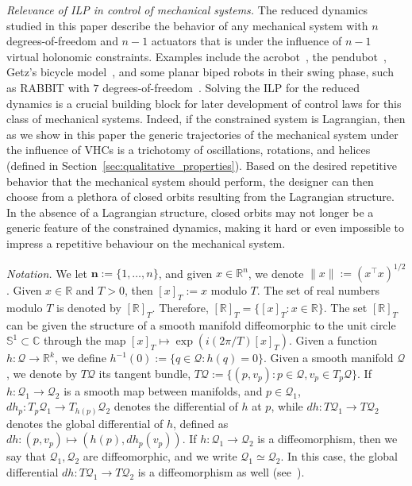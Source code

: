 {\em Relevance of ILP in control of mechanical systems.} The reduced
dynamics studied in this paper describe the behavior of any mechanical
system with $n$ degrees-of-freedom and $n-1$ actuators that is under the
influence of $n-1$ virtual holonomic constraints.  Examples include
the acrobot~\cite{nakanishi-2000}, the
pendubot~\cite{consolini2011swing}, Getz's bicycle
model~\cite{Consolini-2012}, and some planar biped robots in their
swing phase, such as RABBIT with $7$
degrees-of-freedom~\cite{chevallereau2003rabbit}. Solving the ILP for
the reduced dynamics is a crucial building block for later development
of control laws for this class of mechanical systems. Indeed, if the
constrained system is Lagrangian, then as we show in this paper the
generic trajectories of the mechanical system under the influence of
VHCs is a trichotomy of oscillations, rotations, and helices (defined
in Section~\ref{sec:qualitative_properties}). Based on the desired
repetitive behavior that the mechanical system should perform, the
designer can then choose from a plethora of closed orbits resulting
from the Lagrangian structure. In the absence of a Lagrangian
structure, closed orbits may not longer be a generic feature of the
constrained dynamics, making it hard or even impossible to impress a
repetitive behaviour on the mechanical system.

{\em Notation.} We let ${{\mathbf n}}:=\{1,\ldots, n\}$, and given $x \in \mathbb{R}^n$,
we denote $\|x\|:=(x^\top x)^{1/2}$.  Given $x\in \mathbb{R}$ and $T>0$,
then $[x]_T:= x \mbox{ modulo } T$. The set of real numbers modulo $T$
is denoted by ${[\mathbb{R}]_T}$. Therefore, $[\mathbb{R}]_T=\{[x]_T: x\in \mathbb{R}\}$. The set
$[\mathbb{R}]_T$ can be given the structure of a smooth manifold diffeomorphic to
the unit circle $\mathbb{S}^1 \subset \mathbb{C}$ through the map $[x]_T \mapsto
\exp(i  (2\pi/T) [x]_T)$. Given a function $h:\mathcal{Q}\to \mathbb{R}^{k}$, we define
$h^{-1}(0):=\{q\in\mathcal{Q}: h(q)=0\}$.  Given a smooth manifold
$\mathcal{Q}$, we denote by $T \mathcal{Q}$ its tangent bundle, $T\mathcal{Q}:=\{(p,v_p): p
\in \mathcal{Q}, v_p \in T_p \mathcal{Q}\}$. If $h:\mathcal{Q}_1 \to \mathcal{Q}_2$ is a smooth map
between manifolds, and $p\in \mathcal{Q}_1$, $dh_p: T_p \mathcal{Q}_1 \to T_{h(p)}
\mathcal{Q}_2$ denotes the differential of $h$ at $p$, while $dh: T\mathcal{Q}_1 \to T
\mathcal{Q}_2$ denotes the global differential of $h$, defined as $dh:(p,v_p)
\mapsto (h(p),dh_p(v_p))$. If $h:\mathcal{Q}_1 \to \mathcal{Q}_2$ is a diffeomorphism,
then we say that $\mathcal{Q}_1, \mathcal{Q}_2$ are diffeomorphic, and we write $\mathcal{Q}_1
\simeq \mathcal{Q}_2$. In this case, the global differential $dh: T\mathcal{Q}_1 \to T
\mathcal{Q}_2$ is a diffeomorphism as well (see~\cite[Corollary 3.22]{Lee13}).

